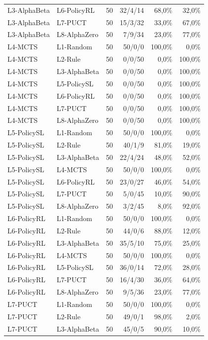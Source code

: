 \begin{small}
\begin{longtable}{@{}llrrrr@{}}
L3-AlphaBeta & L6-PolicyRL & 50 & 32/4/14 & 68,0\% & 32,0\% \\
L3-AlphaBeta & L7-PUCT & 50 & 15/3/32 & 33,0\% & 67,0\% \\
L3-AlphaBeta & L8-AlphaZero & 50 & 7/9/34 & 23,0\% & 77,0\% \\
L4-MCTS & L1-Random & 50 & 50/0/0 & 100,0\% & 0,0\% \\
L4-MCTS & L2-Rule & 50 & 0/0/50 & 0,0\% & 100,0\% \\
L4-MCTS & L3-AlphaBeta & 50 & 0/0/50 & 0,0\% & 100,0\% \\
L4-MCTS & L5-PolicySL & 50 & 0/0/50 & 0,0\% & 100,0\% \\
L4-MCTS & L6-PolicyRL & 50 & 0/0/50 & 0,0\% & 100,0\% \\
L4-MCTS & L7-PUCT & 50 & 0/0/50 & 0,0\% & 100,0\% \\
L4-MCTS & L8-AlphaZero & 50 & 0/0/50 & 0,0\% & 100,0\% \\
L5-PolicySL & L1-Random & 50 & 50/0/0 & 100,0\% & 0,0\% \\
L5-PolicySL & L2-Rule & 50 & 40/1/9 & 81,0\% & 19,0\% \\
L5-PolicySL & L3-AlphaBeta & 50 & 22/4/24 & 48,0\% & 52,0\% \\
L5-PolicySL & L4-MCTS & 50 & 50/0/0 & 100,0\% & 0,0\% \\
L5-PolicySL & L6-PolicyRL & 50 & 23/0/27 & 46,0\% & 54,0\% \\
L5-PolicySL & L7-PUCT & 50 & 5/0/45 & 10,0\% & 90,0\% \\
L5-PolicySL & L8-AlphaZero & 50 & 3/2/45 & 8,0\% & 92,0\% \\
L6-PolicyRL & L1-Random & 50 & 50/0/0 & 100,0\% & 0,0\% \\
L6-PolicyRL & L2-Rule & 50 & 44/0/6 & 88,0\% & 12,0\% \\
L6-PolicyRL & L3-AlphaBeta & 50 & 35/5/10 & 75,0\% & 25,0\% \\
L6-PolicyRL & L4-MCTS & 50 & 50/0/0 & 100,0\% & 0,0\% \\
L6-PolicyRL & L5-PolicySL & 50 & 36/0/14 & 72,0\% & 28,0\% \\
L6-PolicyRL & L7-PUCT & 50 & 16/4/30 & 36,0\% & 64,0\% \\
L6-PolicyRL & L8-AlphaZero & 50 & 9/5/36 & 23,0\% & 77,0\% \\
L7-PUCT & L1-Random & 50 & 50/0/0 & 100,0\% & 0,0\% \\
L7-PUCT & L2-Rule & 50 & 49/0/1 & 98,0\% & 2,0\% \\
L7-PUCT & L3-AlphaBeta & 50 & 45/0/5 & 90,0\% & 10,0\% \\

\end{longtable}
\end{small}
